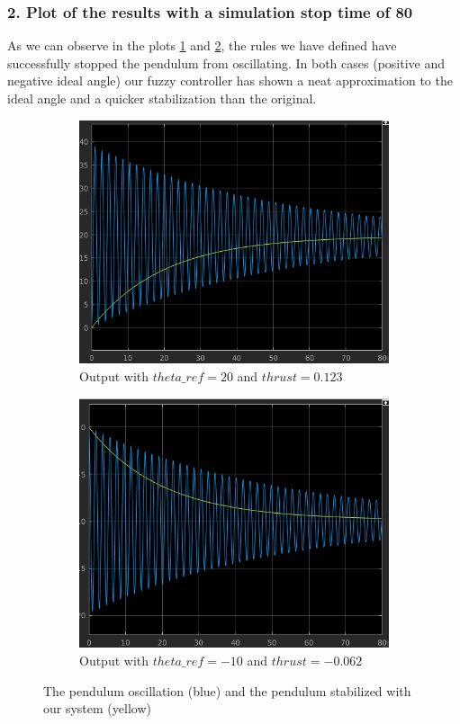 \documentclass{article}[11pt]
\begin{document}
\subsubsection*{2. Plot of the results with a simulation stop time of 80}
As we can observe in the plots \ref{fig:sub1} and \ref{fig:sub2}, the rules we have defined have successfully stopped the pendulum from oscillating. In both cases (positive and negative ideal angle) our fuzzy controller has shown a neat approximation to the ideal angle and a quicker stabilization than the original.%
\begin{figure}[H]
\centering
\hspace*{-1cm}\begin{subfigure}{.6\textwidth}
  \includegraphics[width=0.9\linewidth]{img/result_20_2.png}
  \caption{Output with $theta\_ref = 20$ and $thrust = 0.123$}
  \label{fig:sub1}
\end{subfigure}%
\hspace*{-1cm}\begin{subfigure}{.6\textwidth}
  \centering
  \includegraphics[width=0.9\linewidth]{img/result_minus10.png}
  \caption{Output with $theta\_ref = -10$ and $thrust = -0.062$}
  \label{fig:sub2}
\end{subfigure}
\caption{The pendulum oscillation (blue) and the pendulum stabilized with our system (yellow)}
\label{fig:test}
\end{figure}
\end{document}

